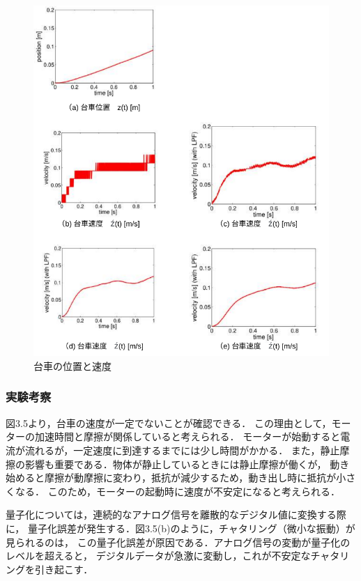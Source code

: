 \begin{figure}[h]
  \centering
  \includegraphics[scale=1]{sozai/3.pdf}
  \caption{台車の位置と速度}
\end{figure}

\newpage

\subsubsection{実験考察}
図3.5より，台車の速度が一定でないことが確認できる．
この理由として，モーターの加速時間と摩擦が関係していると考えられる．
モーターが始動すると電流が流れるが，一定速度に到達するまでには少し時間がかかる．
また，静止摩擦の影響も重要である．物体が静止しているときには静止摩擦が働くが，
動き始めると摩擦が動摩擦に変わり，抵抗が減少するため，動き出し時に抵抗が小さくなる．
このため，モーターの起動時に速度が不安定になると考えられる．

量子化については，連続的なアナログ信号を離散的なデジタル値に変換する際に，
量子化誤差が発生する．図3.5(b)のように，チャタリング（微小な振動）が見られるのは，
この量子化誤差が原因である．アナログ信号の変動が量子化のレベルを超えると，
デジタルデータが急激に変動し，これが不安定なチャタリングを引き起こす．

